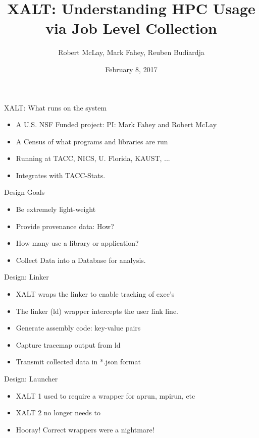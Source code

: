 \documentclass{beamer}
\title{XALT: Understanding HPC Usage via Job Level Collection}
\author{Robert McLay, Mark Fahey, Reuben Budiardja}
\institute{The Texas Advanced Computing Center, Argonne National Labs, NICS}
\date{February 8, 2017}  %
\begin{document}
\begin{frame}
  \titlepage
\end{frame}

\begin{frame}{XALT: What runs on the system}
  \begin{itemize}
    \item A U.S. NSF Funded project: PI: Mark Fahey and Robert McLay
    \item A Census of what programs and libraries are run
    \item Running at TACC, NICS, U. Florida, KAUST, ...
    \item Integrates with TACC-Stats.
  \end{itemize}
\end{frame}

\begin{frame}{Design Goals}
  \begin{itemize}
    \item Be extremely light-weight
    \item Provide provenance data: How?
    \item How many use a library or application?
    \item Collect Data into a Database for analysis.
  \end{itemize}
\end{frame}

\begin{frame}{Design: Linker}
  \begin{itemize}
    \item XALT wraps the linker to enable tracking of exec's
    \item The linker (ld) wrapper intercepts the user link line.
    \item Generate assembly code: key-value pairs
    \item Capture tracemap output from ld
    \item Transmit collected data in *.json format
  \end{itemize}
\end{frame}

\begin{frame}{Design: Launcher}
  \begin{itemize}
    \item XALT 1 used to require a wrapper for aprun, mpirun, etc
    \item XALT 2 no longer needs to
    \item Hooray! Correct wrappers were a nightmare!
  \end{itemize}
\end{frame}
\end{document}
